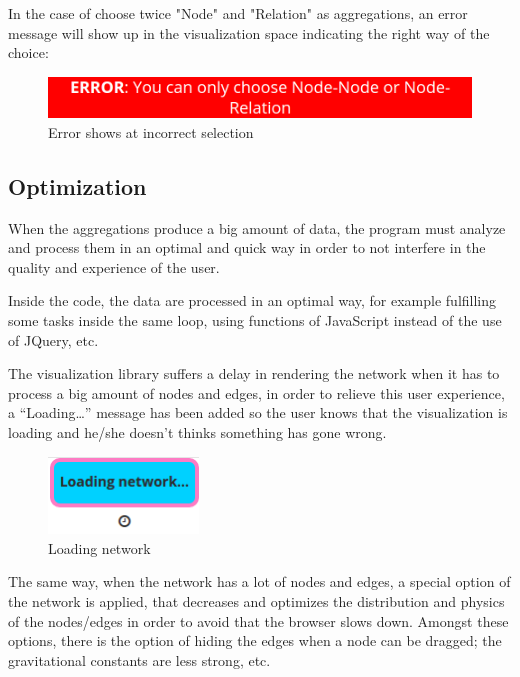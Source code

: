 \documentclass[a4paper, 12pt]{book}
\begin{document}
In the case of choose twice "Node" and "Relation" as aggregations, an error message will show up in the visualization space indicating the right way of the choice:

\begin{figure}[H]
  \centering
  \includegraphics[width=15cm, keepaspectratio]{img/development/errornoderelation}
  \caption{Error shows at incorrect selection}
  \label{fig:errornoderelation}
\end{figure}


\subsection{Optimization}

When the aggregations produce a big amount of data, the program must analyze and process them in an optimal and quick way in order to not interfere in the quality and experience of the user.

Inside the code, the data are processed in an optimal way, for example fulfilling some tasks inside the same loop, using functions of JavaScript instead of the use of JQuery, etc.

The visualization library suffers a delay in rendering the network when it has to process a big amount of nodes and edges, in order to relieve this user experience, a “Loading…” message has been added so the user knows that the visualization is loading and he/she doesn’t thinks something has gone wrong.
 
\begin{figure}[H]
  \centering
  \includegraphics[width=4cm, keepaspectratio]{img/development/loading}
  \caption{Loading network}
  \label{fig:errornoderelation}
\end{figure}

The same way, when the network has a lot of nodes and edges, a special option of the network is applied, that decreases and optimizes the distribution and physics of the nodes/edges in order to avoid that the browser slows down. Amongst these options, there is the option of hiding the edges when a node can be dragged; the gravitational constants are less strong, etc.
\end{document}
